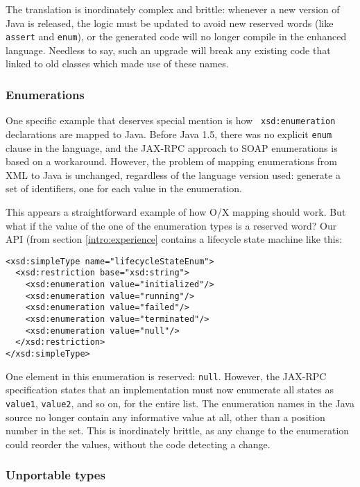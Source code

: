 The translation is inordinately complex and brittle: whenever a new
version of Java is released, the logic must be updated to avoid new
reserved words (like {\tt assert} and {\tt enum}), or the generated
code will no longer compile in the enhanced language. Needless to say,
such an upgrade will break any existing code that linked to old
classes which made use of these names.

\subsubsection{Enumerations}
\label{objections:o-x:enum}

One specific example that deserves special mention is how {\tt
xsd:enumeration} declarations are mapped to Java. Before Java 1.5,
there was no explicit {\tt enum} clause in the language, and the
JAX-RPC approach to SOAP enumerations is based on a
workaround. However, the problem of mapping enumerations from XML to
Java is unchanged, regardless of the language version used: generate a
set of identifiers, one for each value in the enumeration.

This appears a straightforward example of how O/X mapping should
work. But what if the value of the one of the enumeration types is a
reserved word?  Our API (from section \ref{intro:experience} contains
a lifecycle state machine like this:

\begin{verbatim}
<xsd:simpleType name="lifecycleStateEnum">
  <xsd:restriction base="xsd:string"> 
    <xsd:enumeration value="initialized"/> 
    <xsd:enumeration value="running"/> 
    <xsd:enumeration value="failed"/> 
    <xsd:enumeration value="terminated"/> 
    <xsd:enumeration value="null"/> 
  </xsd:restriction>
</xsd:simpleType>
\end{verbatim}

One element in this enumeration is reserved: {\tt null}. However, the
JAX-RPC specification states that an implementation must now enumerate
all states as {\tt value1}, {\tt value2}, and so on, for the entire
list.  The enumeration names in the Java source no longer contain any
informative value at all, other than a position number in the
set. This is inordinately brittle, as any change to the enumeration
could reorder the values, without the code detecting a change.

\subsubsection{Unportable types}
\label{objections:o-x:types}

